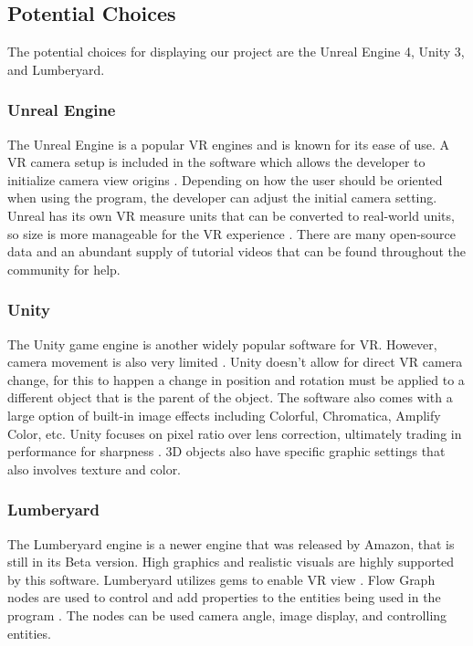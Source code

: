 \documentclass[onecolumn, draftclsnofoot, 10pt, compsoc]{IEEEtran}
\begin{document}
\subsection{Potential Choices}
\begin{singlespace}
The potential choices for displaying our project are the Unreal Engine 4, Unity 3, and Lumberyard.   
\end{singlespace}

\subsubsection{Unreal Engine}
\begin{singlespace}
The Unreal Engine is a popular VR engines and is known for its ease of use. A VR camera setup is included in the software which allows the developer to initialize camera view origins \cite{UE4 EG}. Depending on how the user should be oriented when using the program, the developer can adjust the initial camera setting. Unreal has its own VR measure units that can be converted to real-world units, so size is more manageable for the VR experience \cite{UE4 EG}. There are many open-source data and an abundant supply of tutorial videos that can be found throughout the community for help.   

\end{singlespace}

\subsubsection{Unity}
\begin{singlespace}
The Unity game engine is another widely popular software for VR. However, camera movement is also very limited \cite{unity doc}. Unity doesn’t allow for direct VR camera change, for this to happen a change in position and rotation must be applied to a different object that is the parent of the object. The software also comes with a large option of built-in image effects including Colorful, Chromatica, Amplify Color, etc. Unity focuses on pixel ratio over lens correction, ultimately trading in performance for sharpness \cite{unity3d}. 3D objects also have specific graphic settings that also involves texture and color. 
 
\end{singlespace}

\subsubsection{Lumberyard}
\begin{singlespace}
The Lumberyard engine is a newer engine that was released by Amazon, that is still in its Beta version. High graphics and realistic visuals are highly supported by this software. Lumberyard utilizes gems to enable VR view \cite{lumberyard}. Flow Graph nodes are used to control and add properties to the entities being used in the program \cite{lumberyard doc}. The nodes can be used camera angle, image display, and controlling entities.    
\end{singlespace}
\end{document}
